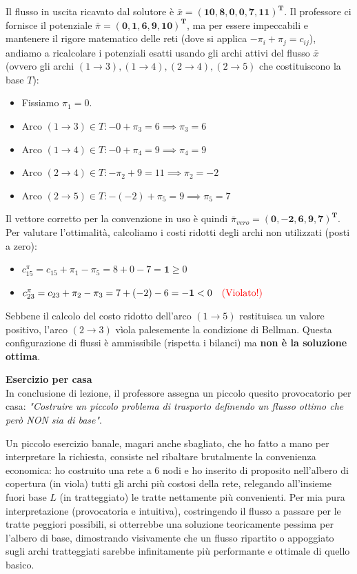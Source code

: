 \documentclass[12pt, a4paper]{article}
\newcommand{\separatore}{\noindent{\color{titlecolor!50}\rule{\textwidth}{0.6pt}}}
\begin{document}
	Il flusso in uscita ricavato dal solutore è $\bar{x} = \mathbf{(10, 8, 0, 0, 7, 11)^T}$.
	Il professore ci fornisce il potenziale $\bar{\pi} = \mathbf{(0, 1, 6, 9, 10)^T}$, ma per essere impeccabili e mantenere il rigore matematico delle reti (dove si applica $-\pi_i + \pi_j = c_{ij}$), andiamo a ricalcolare i potenziali esatti usando gli archi attivi del flusso $\bar{x}$ (ovvero gli archi $(1\to3), (1\to4), (2\to4), (2\to5)$ che costituiscono la base $T$):
	\begin{itemize}
		\item Fissiamo $\pi_1 = 0$.
		\item Arco $(1\to3) \in T: -0 + \pi_3 = 6 \implies \pi_3 = 6$
		\item Arco $(1\to4) \in T: -0 + \pi_4 = 9 \implies \pi_4 = 9$
		\item Arco $(2\to4) \in T: -\pi_2 + 9 = 11 \implies \pi_2 = -2$
		\item Arco $(2\to5) \in T: -(-2) + \pi_5 = 9 \implies \pi_5 = 7$
	\end{itemize}
	Il vettore corretto per la convenzione in uso è quindi $\bar{\pi}_{vero} = \mathbf{(0, -2, 6, 9, 7)^T}$.
	Per valutare l'ottimalità, calcoliamo i costi ridotti degli archi non utilizzati (posti a zero):
	\begin{itemize}
		\item $c_{15}^\pi = c_{15} + \pi_1 - \pi_5 = 8 + 0 - 7 = \mathbf{1} \ge 0$
		\item $c_{23}^\pi = c_{23} + \pi_2 - \pi_3 = 7 + (-2) - 6 = \mathbf{-1} < 0 \quad \text{\textcolor{red}{(Violato!)}}$
	\end{itemize}
	Sebbene il calcolo del costo ridotto dell'arco $(1\to5)$ restituisca un valore positivo, l'arco $(2\to3)$ vìola palesemente la condizione di Bellman. Questa configurazione di flussi è ammissibile (rispetta i bilanci) ma \textbf{non è la soluzione ottima}.
	
	\vspace{0.6cm}
	\separatore
	\vspace{0.4cm}
	
	\textbf{Esercizio per casa}\\
	In conclusione di lezione, il professore assegna un piccolo quesito provocatorio per casa: \textit{"Costruire un piccolo problema di trasporto definendo un flusso ottimo che però NON sia di base"}. 
	
	Un piccolo esercizio banale, magari anche sbagliato, che ho fatto a mano per interpretare la richiesta, consiste nel ribaltare brutalmente la convenienza economica: ho costruito una rete a 6 nodi e ho inserito di proposito nell'albero di copertura (in viola) tutti gli archi più costosi della rete, relegando all'insieme fuori base $L$ (in tratteggiato) le tratte nettamente più convenienti. Per mia pura interpretazione (provocatoria e intuitiva), costringendo il flusso a passare per le tratte peggiori possibili, si otterrebbe una soluzione teoricamente pessima per l'albero di base, dimostrando visivamente che un flusso ripartito o appoggiato sugli archi tratteggiati sarebbe infinitamente più performante e ottimale di quello basico.
	
\end{document}
